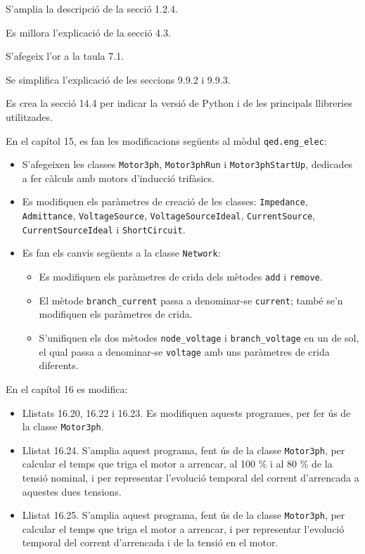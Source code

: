 S'amplia la descripció de la secció 1.2.4.

Es millora l'explicació de la secció 4.3.

S'afegeix l'or a la taula 7.1.

Se simplifica l'explicació de les seccions 9.9.2 i 9.9.3.

Es crea la secció 14.4 per indicar la versió de Python i de les principals llibreries utilitzades. 


En el capítol 15, es fan les modificacions següents al mòdul  \texttt{qed.eng\_elec}:
\begin{itemize}
	\item S'afegeixen les classes  \texttt{Motor3ph}, \texttt{Motor3phRun} i 
	\texttt{Motor3phStartUp}, dedicades a fer càlculs amb motors d'inducció trifàsics.
	\item Es modifiquen els paràmetres de creació de les classes: \texttt{Impedance}, \texttt{Admittance}, \texttt{VoltageSource}, \texttt{VoltageSourceIdeal}, \texttt{CurrentSource}, \texttt{CurrentSourceIdeal} i \texttt{ShortCircuit}.
	\item Es fan els canvis següents a la classe \texttt{Network}:
	\begin{itemize}
		\item Es modifiquen els paràmetres de crida dels mètodes \texttt{add} i \texttt{remove}.
		\item  El mètode \texttt{branch\_current} passa a denominar-se \texttt{current}; també se'n modifiquen els paràmetres de crida.
		\item S'unifiquen els dos mètodes \texttt{node\_voltage} i \texttt{branch\_voltage} en un de sol, el qual passa a denominar-se \texttt{voltage} amb uns paràmetres de crida diferents. 
	\end{itemize}
\end{itemize}

En el capítol 16 es modifica:
\begin{itemize}
	\item Llistats 16.20, 16.22 i 16.23. Es modifiquen aquests programes, per fer ús de la classe \texttt{Motor3ph}.
	\item Llistat 16.24. S'amplia aquest programa, fent ús de la classe \texttt{Motor3ph}, per  calcular el temps que triga el motor a arrencar, al 100 \% i al 80 \% de la tensió nominal, i per representar l'evolució temporal del corrent d'arrencada a aquestes dues tensions.
	\item  Llistat 16.25. S'amplia aquest programa, fent ús de la classe \texttt{Motor3ph}, per  calcular el temps que triga el motor a arrencar, i per representar l'evolució temporal del  corrent d'arrencada i de la tensió en el motor.
\end{itemize}

